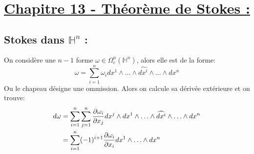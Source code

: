 \section*{\uline{Chapitre 13 - Théorème de Stokes {:}}}
   \subsection*{Stokes dans \( \mathbb{H}^n \) {:}}
   On considère une \( n-1\) forme \(\omega \in \Omega_c^n(\mathbb{H}^n)\), alors elle est de la forme:
   \[ 
      \omega = \sum_{i = 1}^n \omega_i dx^1 \wedge \ldots \wedge \widehat{dx^i} \wedge \ldots \wedge dx^n
   \]
   Ou le chapeau désigne une ommission. Alors on calcule sa dérivée extérieure et on trouve:
   \begin{align*}
      d\omega &= \sum_{i = 1}^n \sum_{j = 1}^n \frac{\partial \omega_i}{\partial x_j} dx^j \wedge dx^1 \wedge \ldots \wedge \widehat{dx^i} \wedge \ldots \wedge dx^n\\
      &=  \sum_{i = 1}^n (-1)^{i+1} \frac{\partial \omega_i}{\partial x_i} dx^1 \wedge \ldots \wedge dx^n
   \end{align*}
